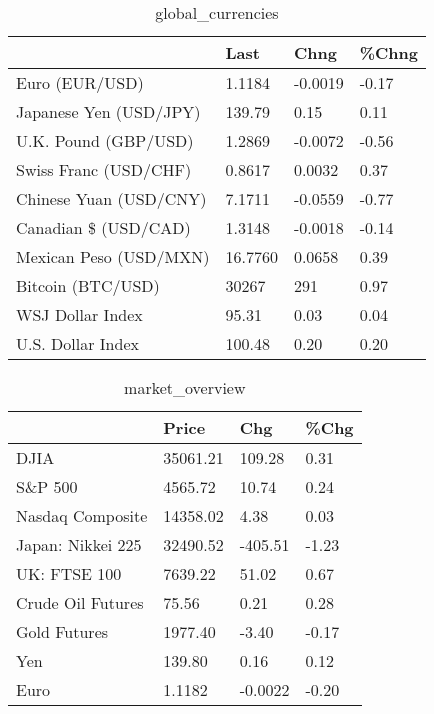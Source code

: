 \documentclass{article}%
\begin{document}
%


\begin{table}[htbp]%
\caption{global\_currencies}%
\centering%
\begin{adjustbox}{width=1\textwidth}%
\begin{tabular}{llll}
\toprule
                       &    Last &    Chng & \%Chng \\
\midrule
        Euro (EUR/USD) &  1.1184 & -0.0019 & -0.17 \\
Japanese Yen (USD/JPY) &  139.79 &    0.15 &  0.11 \\
  U.K. Pound (GBP/USD) &  1.2869 & -0.0072 & -0.56 \\
 Swiss Franc (USD/CHF) &  0.8617 &  0.0032 &  0.37 \\
Chinese Yuan (USD/CNY) &  7.1711 & -0.0559 & -0.77 \\
  Canadian \$ (USD/CAD) &  1.3148 & -0.0018 & -0.14 \\
Mexican Peso (USD/MXN) & 16.7760 &  0.0658 &  0.39 \\
     Bitcoin (BTC/USD) &   30267 &     291 &  0.97 \\
      WSJ Dollar Index &   95.31 &    0.03 &  0.04 \\
     U.S. Dollar Index &  100.48 &    0.20 &  0.20 \\
\bottomrule
\end{tabular}
%
\end{adjustbox}%
\end{table}

%


\begin{table}[htbp]%
\caption{market\_overview}%
\centering%
\begin{adjustbox}{width=1\textwidth}%
\begin{tabular}{llll}
\toprule
                  &    Price &     Chg &  \%Chg \\
\midrule
             DJIA & 35061.21 &  109.28 &  0.31 \\
          S\&P 500 &  4565.72 &   10.74 &  0.24 \\
 Nasdaq Composite & 14358.02 &    4.38 &  0.03 \\
Japan: Nikkei 225 & 32490.52 & -405.51 & -1.23 \\
     UK: FTSE 100 &  7639.22 &   51.02 &  0.67 \\
Crude Oil Futures &    75.56 &    0.21 &  0.28 \\
     Gold Futures &  1977.40 &   -3.40 & -0.17 \\
              Yen &   139.80 &    0.16 &  0.12 \\
             Euro &   1.1182 & -0.0022 & -0.20 \\
\bottomrule
\end{tabular}
%
\end{adjustbox}%
\end{table}

%
\end{document}
